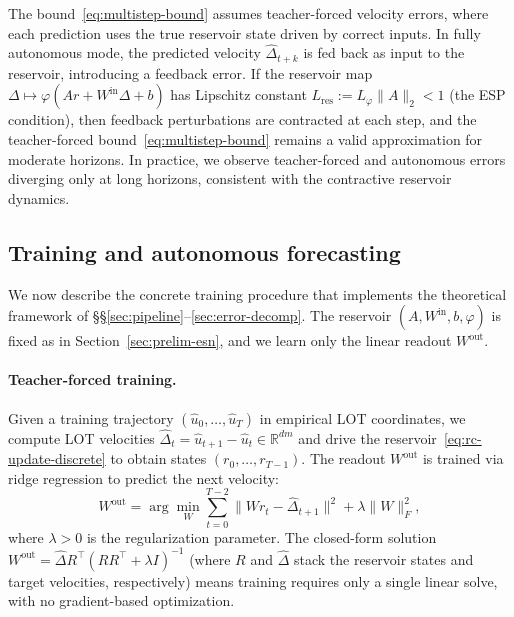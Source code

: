 \documentclass[11pt]{article}
\newcommand{\R}{\mathbb{R}}
\newcommand{\1}{\mathbf{1}}
\begin{document}
\begin{remark}\label{rem:autonomous}
The bound~\eqref{eq:multistep-bound} assumes teacher-forced velocity
errors, where each prediction uses the true reservoir state driven by
correct inputs. In fully autonomous mode, the predicted velocity
$\widehat{\Delta}_{t+k}$ is fed back as input to the reservoir, introducing
a feedback error. If the reservoir map
$\Delta \mapsto \varphi(A r + W^{\mathrm{in}} \Delta + b)$ has Lipschitz
constant $L_{\mathrm{res}} := L_\varphi \|A\|_2 < 1$ (the ESP condition),
then feedback perturbations are contracted at each step, and the
teacher-forced bound~\eqref{eq:multistep-bound} remains a valid
approximation for moderate horizons. In practice, we observe teacher-forced
and autonomous errors diverging only at long horizons, consistent with the
contractive reservoir dynamics.
\end{remark}


\subsection{Training and autonomous forecasting}\label{sec:training}

We now describe the concrete training procedure that implements the theoretical framework of \S\S\ref{sec:pipeline}--\ref{sec:error-decomp}. The reservoir $(A, W^{\mathrm{in}}, b, \varphi)$ is fixed as in Section~\ref{sec:prelim-esn}, and we learn only the linear readout $W^{\mathrm{out}}$.

\paragraph{Teacher-forced training.}
Given a training trajectory $(\hat{u}_0, \ldots, \hat{u}_T)$ in empirical
LOT coordinates, we compute LOT velocities
$\hat{\Delta}_t = \hat{u}_{t+1} - \hat{u}_t \in \R^{dm}$ and drive the
reservoir~\eqref{eq:rc-update-discrete} to obtain states
$(r_0, \ldots, r_{T-1})$. The readout $W^{\mathrm{out}}$ is trained via
ridge regression to predict the next velocity:
\begin{equation}\label{eq:ridge}
  W^{\mathrm{out}}
  = \arg\min_{W} \sum_{t=0}^{T-2}
  \|W r_t - \hat{\Delta}_{t+1}\|^2
  + \lambda \|W\|_F^2,
\end{equation}
where $\lambda > 0$ is the regularization parameter. The closed-form solution $W^{\mathrm{out}} = \hat{\Delta} R^\top (R R^\top + \lambda I)^{-1}$ (where $R$ and $\hat{\Delta}$ stack the reservoir states and target velocities, respectively) means training requires only a single linear solve, with no gradient-based optimization.
\end{document}
